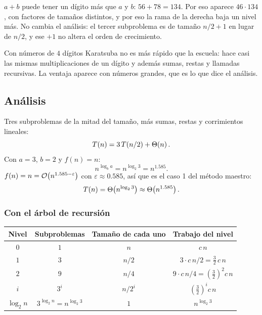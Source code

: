 \documentclass[11pt,letterpaper]{article}
\begin{document}
\begin{ojo}
  $a + b$ puede tener un dígito más que $a$ y $b$: $56 + 78 = 134$. Por
  eso aparece $46 \cdot 134$, con factores de tamaños distintos, y por
  eso la rama de la derecha baja un nivel más. No cambia el análisis:
  el tercer subproblema es de tamaño $n/2 + 1$ en lugar de $n/2$, y ese
  $+1$ no altera el orden de crecimiento.
\end{ojo}

\begin{observacion}
  Con números de $4$ dígitos Karatsuba no es más rápido que la
  escuela: hace casi las mismas multiplicaciones de un dígito y además
  sumas, restas y llamadas recursivas. La ventaja aparece con números
  grandes, que es lo que dice el análisis.
\end{observacion}


\subsection*{Análisis}

Tres subproblemas de la mitad del tamaño, más sumas, restas y
corrimientos lineales:
\[
  T(n) = 3\, T(n/2) + \Theta\!\left(n\right) .
\]
Con $a = 3$, $b = 2$ y $f(n) = n$:
\[
  n^{\log_b a} = n^{\log_2 3} = n^{1.585} .
\]
$f(n) = n = \mathcal{O}\!\left(n^{1.585 - \varepsilon}\right)$ con
$\varepsilon \approx 0.585$, así que es el caso 1 del método maestro:
\[
  T(n) = \Theta\!\left(n^{\log_2 3}\right) \approx \Theta\!\left(n^{1.585}\right) .
\]

\subsubsection*{Con el árbol de recursión}

\begin{center}
\begin{tabular}{cccc}
  \toprule
  \textbf{Nivel} & \textbf{Subproblemas} & \textbf{Tamaño de cada uno}
    & \textbf{Trabajo del nivel} \\
  \midrule
  $0$ & $1$ & $n$ & $c\,n$ \\
  $1$ & $3$ & $n/2$ & $3 \cdot c\,n/2 = \tfrac{3}{2}\, c\,n$ \\
  $2$ & $9$ & $n/4$ & $9 \cdot c\,n/4 = \left(\tfrac{3}{2}\right)^2 c\,n$ \\
  $i$ & $3^{i}$ & $n/2^{i}$ & $\left(\tfrac{3}{2}\right)^{i} c\,n$ \\
  $\log_2 n$ & $3^{\log_2 n} = n^{\log_2 3}$ & $1$ & $n^{\log_2 3}$ \\
  \bottomrule
\end{tabular}
\end{center}
\end{document}
